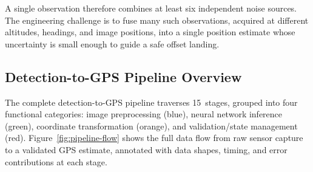 \noindent A single observation therefore combines at least six independent noise sources.  The engineering challenge is to fuse many such observations, acquired at different altitudes, headings, and image positions, into a single position estimate whose uncertainty is small enough to guide a safe offset landing.

\subsection{Detection-to-GPS Pipeline Overview}\label{sec:pipeline-overview}

\usetikzlibrary{shapes.geometric, shapes.misc, arrows.meta, positioning, calc, fit}

The complete detection-to-GPS pipeline traverses 15~stages, grouped into four functional categories: image preprocessing (blue), neural network inference (green), coordinate transformation (orange), and validation/state management (red).  Figure~\ref{fig:pipeline-flow} shows the full data flow from raw sensor capture to a validated GPS estimate, annotated with data shapes, timing, and error contributions at each stage.

